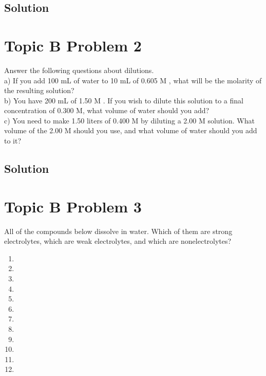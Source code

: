 \documentclass[10pt]{article}
\begin{document}
        \subsection{Solution}

    \pagebreak
    \section{Topic B Problem 2}
        Answer the following questions about dilutions.\\
        a) If you add 100 mL of water to 10 mL of 0.605 M , what will be the molarity of the resulting solution?\\
        b) You have 200 mL of 1.50 M . 
        If you wish to dilute this solution to a final concentration of 0.300 M, what volume of water should you add?\\
        c) You need to make 1.50 liters of 0.400 M  by diluting a 2.00 M  solution. 
        What volume of the 2.00 M  should you use, and what volume of water should you add to it?

        \subsection{Solution}

    \pagebreak
    \section{Topic B Problem 3}
        All of the compounds below dissolve in water. 
        Which of them are strong electrolytes, which are weak electrolytes, and which are nonelectrolytes?
        \begin{multicols}{4}
            \begin{enumerate}[label=\alph*)]
                \item   {}
                \item   {}
                \item   {}
                \item   {}
                \item   {}
                \item   {}
                \item   {}
                \item   {}
                \item   {}
                \item   {}
                \item   {}
                \item   {}
            \end{enumerate}
        \end{multicols}
\end{document}
